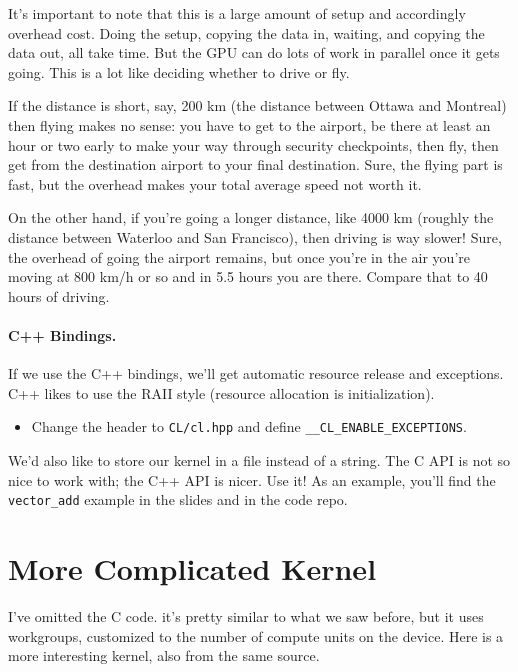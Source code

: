 It's important to note that this is a large amount of setup and accordingly overhead cost. Doing the setup, copying the data in, waiting, and copying the data out, all take time. But the GPU can do lots of work in parallel once it gets going. This is a lot like deciding whether to drive or fly. 

If the distance is short, say, 200 km (the distance between Ottawa and Montreal) then flying makes no sense: you have to get to the airport, be there at least an hour or two early to make your way through security checkpoints, then fly, then get from the destination airport to your final destination. Sure, the flying part is fast, but the overhead makes your total average speed not worth it.

On the other hand, if you're going a longer distance, like 4000 km (roughly the distance between Waterloo and San Francisco), then driving is way slower! Sure, the overhead of going the airport remains, but once you're in the air you're moving at 800 km/h or so and in 5.5 hours you are there. Compare that to 40 hours of driving.

\paragraph{C++ Bindings.}
    If we use the C++ bindings, we'll get automatic resource release and
      exceptions.
 C++ likes to use the RAII style
          (resource allocation is initialization).

\begin{itemize}
\item    Change the header to {\tt CL/cl.hpp} and define
      {\tt \_\_CL\_ENABLE\_EXCEPTIONS}.
\end{itemize}

We'd also like to store our kernel in a file instead of a string.
The C API is not so nice to work with; the C++ API is nicer. Use it!
As an example, you'll find the {\tt vector\_add} example in the slides and
in the code repo. 


\section*{More Complicated Kernel}
I've omitted the C code. it's pretty similar to what we saw
before, but it uses workgroups, customized to the number of
compute units on the device.  Here is a more interesting kernel, also from the same source.

